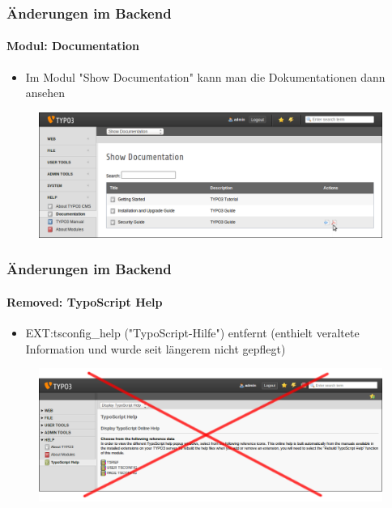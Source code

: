 \begin{frame}[fragile]
	\frametitle{Änderungen im Backend}
	\framesubtitle{Modul: Documentation}

	\begin{itemize}
		\item Im Modul "Show Documentation" kann man die Dokumentationen dann ansehen
	\end{itemize}

	\begin{figure}
		\includegraphics[width=0.95\linewidth]{Images/BackendChanges/ShowDocumentation.png}
	\end{figure}

\end{frame}


\begin{frame}[fragile]
	\frametitle{Änderungen im Backend}
	\framesubtitle{Removed: TypoScript Help}

 	\begin{itemize}
		\item EXT:tsconfig\_help ("TypoScript-Hilfe") entfernt\newline
			\small(enthielt veraltete Information und wurde seit längerem nicht gepflegt)
	\end{itemize}

	\begin{figure}
		\includegraphics[width=0.95\linewidth]{Images/BackendChanges/TypoScriptHelpRemovedCrossed.png}
	\end{figure}

\end{frame}


